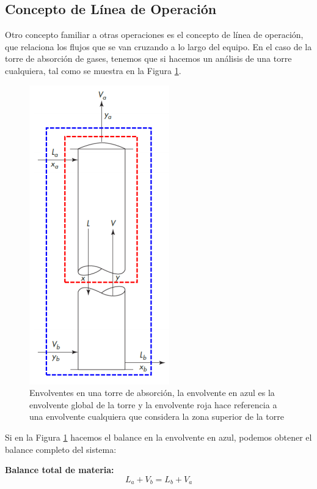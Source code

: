 \documentclass[11pt]{book}
\begin{document}
\subsection{Concepto de Línea de Operación}

Otro concepto familiar a otras operaciones es el concepto de línea de operación, que relaciona los flujos que se van cruzando a lo largo del equipo. En el caso de la torre de absorción de gases, tenemos que si hacemos un análisis de una torre cualquiera, tal como se muestra en la Figura \ref{fig:Absorcion_8}.

\begin{figure}
    \centering
    \includegraphics{img/absorcion/Absorcion_8.PNG}
    \caption{Envolventes en una torre de absorción, la envolvente en azul es la envolvente global de la torre y la envolvente roja hace referencia a una envolvente cualquiera que considera la zona superior de la torre}
    \label{fig:Absorcion_8}
\end{figure}

Si en la Figura \ref{fig:Absorcion_8} hacemos el balance en la envolvente en azul, podemos obtener el balance completo del sistema:

\textbf{Balance total de materia:}
\begin{equation}
    \label{eq:Absorcion_40}
    L_a + V_b = L_b + V_a
\end{equation}
\end{document}
